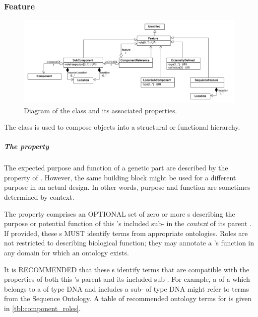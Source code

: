\subsubsection{Feature}
\label{sec:Feature}

\begin{figure}[ht]
\begin{center}
\includegraphics[width=\textwidth]{uml/feature}
\caption[]{Diagram of the  class and its associated properties.}
\label{uml:subcomponent}
\end{center}
\end{figure}

The  class is used to compose  objects into a structural or functional hierarchy. 

\subparagraph{The  property}\label{sec:roles:C}

The expected purpose and function of a genetic part are described by the
 property of . However, the same building block might be used for a different purpose in an actual design. In other words, purpose and function are sometimes determined by context. 

The  property comprises an OPTIONAL set of zero or more  s describing the purpose or potential function of this 's included sub- in the \textit{context} of its parent .
If provided, these  s MUST identify terms from appropriate ontologies. Roles are not restricted to describing biological function; they may annotate a 's function in any domain for which an ontology exists.

It is RECOMMENDED that these  s identify terms that are compatible with the  properties of both this 's parent  and its included sub-. For example, a  of a  which belongs to a  of type DNA and includes a sub- of type DNA might refer to terms from the Sequence Ontology. A table of recommended ontology terms for  is given in \ref{tbl:component_roles}.

